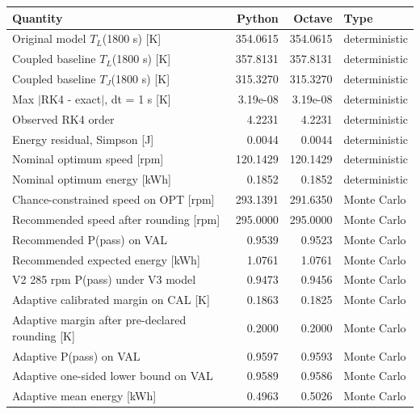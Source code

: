 \begin{tabular}{lrrl}
\toprule
Quantity & Python & Octave & Type \\
\midrule
Original model $T_L$(1800 s) [K] & 354.0615 & 354.0615 & deterministic \\
Coupled baseline $T_L$(1800 s) [K] & 357.8131 & 357.8131 & deterministic \\
Coupled baseline $T_J$(1800 s) [K] & 315.3270 & 315.3270 & deterministic \\
Max $|$RK4 - exact$|$, dt = 1 s [K] & 3.19e-08 & 3.19e-08 & deterministic \\
Observed RK4 order & 4.2231 & 4.2231 & deterministic \\
Energy residual, Simpson [J] & 0.0044 & 0.0044 & deterministic \\
Nominal optimum speed [rpm] & 120.1429 & 120.1429 & deterministic \\
Nominal optimum energy [kWh] & 0.1852 & 0.1852 & deterministic \\
Chance-constrained speed on OPT [rpm] & 293.1391 & 291.6350 & Monte Carlo \\
Recommended speed after rounding [rpm] & 295.0000 & 295.0000 & Monte Carlo \\
Recommended P(pass) on VAL & 0.9539 & 0.9523 & Monte Carlo \\
Recommended expected energy [kWh] & 1.0761 & 1.0761 & Monte Carlo \\
V2 285 rpm P(pass) under V3 model & 0.9473 & 0.9456 & Monte Carlo \\
Adaptive calibrated margin on CAL [K] & 0.1863 & 0.1825 & Monte Carlo \\
Adaptive margin after pre-declared rounding [K] & 0.2000 & 0.2000 & Monte Carlo \\
Adaptive P(pass) on VAL & 0.9597 & 0.9593 & Monte Carlo \\
Adaptive one-sided lower bound on VAL & 0.9589 & 0.9586 & Monte Carlo \\
Adaptive mean energy [kWh] & 0.4963 & 0.5026 & Monte Carlo \\
\bottomrule
\end{tabular}
